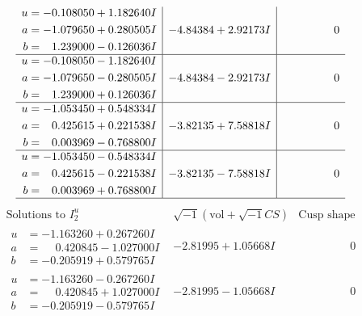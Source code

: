 \documentclass[1p]{elsarticle_modified}
\theoremstyle{definition}
\newcommand{\I}{\sqrt{-1}}
\begin{document}
$$\begin{array}{c|c|c}
\begin{aligned}
u &= -0.108050 + 1.182640 I \\
a &= -1.079650 + 0.280505 I \\
b &= \phantom{-}1.239000 - 0.126036 I\end{aligned}
 & -4.84384 + 2.92173 I & \phantom{-0.000000 } 0 \\ \hline\begin{aligned}
u &= -0.108050 - 1.182640 I \\
a &= -1.079650 - 0.280505 I \\
b &= \phantom{-}1.239000 + 0.126036 I\end{aligned}
 & -4.84384 - 2.92173 I & \phantom{-0.000000 } 0 \\ \hline\begin{aligned}
u &= -1.053450 + 0.548334 I \\
a &= \phantom{-}0.425615 + 0.221538 I \\
b &= \phantom{-}0.003969 - 0.768800 I\end{aligned}
 & -3.82135 + 7.58818 I & \phantom{-0.000000 } 0 \\ \hline\begin{aligned}
u &= -1.053450 - 0.548334 I \\
a &= \phantom{-}0.425615 - 0.221538 I \\
b &= \phantom{-}0.003969 + 0.768800 I\end{aligned}
 & -3.82135 - 7.58818 I & \phantom{-0.000000 } 0\\
 \hline 
 \end{array}$$\newpage$$\begin{array}{c|c|c}  
\text{Solutions to }I^u_{2}& \I (\text{vol} + \sqrt{-1}CS) & \text{Cusp shape}\\
 \hline 
\begin{aligned}
u &= -1.163260 + 0.267260 I \\
a &= \phantom{-}0.420845 - 1.027000 I \\
b &= -0.205919 + 0.579765 I\end{aligned}
 & -2.81995 + 1.05668 I & \phantom{-0.000000 } 0 \\ \hline\begin{aligned}
u &= -1.163260 - 0.267260 I \\
a &= \phantom{-}0.420845 + 1.027000 I \\
b &= -0.205919 - 0.579765 I\end{aligned}
 & -2.81995 - 1.05668 I & \phantom{-0.000000 } 0 \\ \hline\begin{aligned}

\end{aligned}
\end{array}$$
\end{document}
